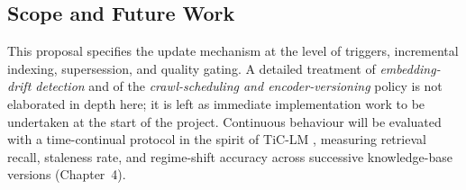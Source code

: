 \subsection{Scope and Future Work}
This proposal specifies the update mechanism at the level of triggers, incremental indexing, supersession, and quality gating. A detailed treatment of \emph{embedding-drift detection} and of the \emph{crawl-scheduling and encoder-versioning} policy is not elaborated in depth here; it is left as immediate implementation work to be undertaken at the start of the project. Continuous behaviour will be evaluated with a time-continual protocol in the spirit of TiC-LM \parencite{li2025ticlmwebscalebenchmarktimecontinual}, measuring retrieval recall, staleness rate, and regime-shift accuracy across successive knowledge-base versions (Chapter~4).
